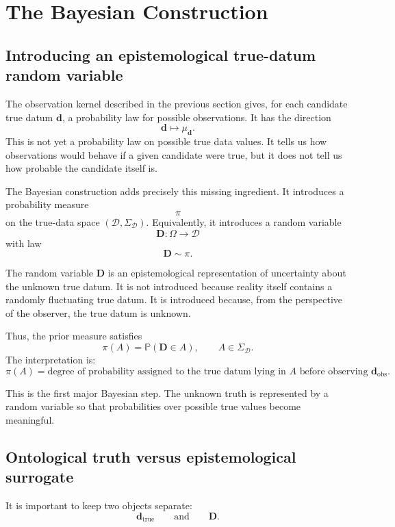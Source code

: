 \documentclass[11pt]{article}
\newcommand{\Dspace}{\mathcal D}
\newcommand{\SigmaD}{\Sigma_{\mathcal D}}
\newcommand{\prior}{\pi}
\newcommand{\Drand}{\mathbf D}
\newcommand{\dtrue}{\mathbf d_{\mathrm{true}}}
\newcommand{\dobs}{\mathbf d_{\mathrm{obs}}}
\newcommand{\Prob}{\mathbb P}
\begin{document}
\section{The Bayesian Construction}

\subsection{Introducing an epistemological true-datum random variable}

The observation kernel described in the previous section gives, for each candidate true datum \(\mathbf d\), a probability law for possible observations. It has the direction
\[
    \mathbf d
    \longmapsto
    \mu_{\mathbf d}.
\]
This is not yet a probability law on possible true data values. It tells us how observations would behave if a given candidate were true, but it does not tell us how probable the candidate itself is.

The Bayesian construction adds precisely this missing ingredient. It introduces a probability measure
\[
    \prior
\]
on the true-data space \((\Dspace,\SigmaD)\). Equivalently, it introduces a random variable
\[
    \Drand:\Omega\to\Dspace
\]
with law
\[
    \Drand\sim\prior.
\]

The random variable \(\Drand\) is an epistemological representation of uncertainty about the unknown true datum. It is not introduced because reality itself contains a randomly fluctuating true datum. It is introduced because, from the perspective of the observer, the true datum is unknown.

Thus, the prior measure satisfies
\[
    \prior(A)
    =
    \Prob(\Drand\in A),
    \qquad
    A\in\SigmaD.
\]
The interpretation is:
\[
    \prior(A)
    =
    \text{degree of probability assigned to the true datum lying in } A
    \text{ before observing } \dobs.
\]

This is the first major Bayesian step. The unknown truth is represented by a random variable so that probabilities over possible true values become meaningful.

\subsection{Ontological truth versus epistemological surrogate}

It is important to keep two objects separate:
\[
    \dtrue
    \qquad
    \text{and}
    \qquad
    \Drand.
\]
\end{document}
